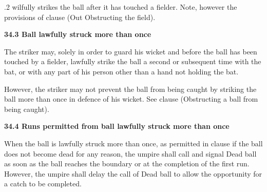 \documentclass[12pt]{article}
\begin{document}
\vspace{\baselineskip}
\begin{adjustwidth}{0.5in}{0.44in}
{\fontsize{9pt}{10.8pt}.2 \tabto{0.49in} wilfully strikes the ball after it has touched a fielder. Note, however the provisions of clause (Out Obstructing the field).\par}\par

\end{adjustwidth}


\vspace{\baselineskip}
{\fontsize{11pt}{13.2pt}\selectfont \textbf{34.3 \tabto{0.47in} Ball lawfully struck more than once}\par}\par


\vspace{\baselineskip}
\begin{adjustwidth}{0.0in}{0.17in}
{\fontsize{9pt}{10.8pt}\selectfont The striker may, solely in order to guard his wicket and before the ball has been touched by a fielder, lawfully strike the ball a second or subsequent time with the bat, or with any part of his person other than a hand not holding the bat.\par}\par

\end{adjustwidth}


\vspace{\baselineskip}
\begin{adjustwidth}{0.0in}{0.1in}
{\fontsize{9pt}{10.8pt}\selectfont However, the striker may not prevent the ball from being caught by striking the ball more than once in defence of his wicket. See clause (Obstructing a ball from being caught).\par}\par

\end{adjustwidth}


\vspace{\baselineskip}
{\fontsize{11pt}{13.2pt}\selectfont \textbf{34.4 \tabto{0.47in} Runs permitted from ball lawfully struck more than once}\par}\par


\vspace{\baselineskip}
\begin{adjustwidth}{0.0in}{0.04in}
{\fontsize{9pt}{10.8pt}\selectfont When the ball is lawfully struck more than once, as permitted in clause if the ball does not become dead for any reason, the umpire shall call and signal Dead ball as soon as the ball reaches the boundary or at the completion of the first run. However, the umpire shall delay the call of Dead ball to allow the opportunity for a catch to be completed.\par}\par

\end{adjustwidth}
\end{document}
